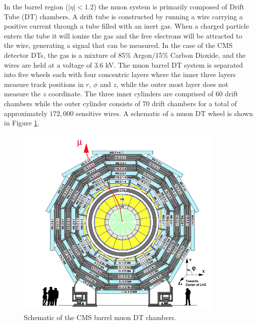 In the barrel region ($|\eta| < 1.2$) the muon system is primarily composed of Drift Tube (DT) chambers.
A drift tube is constructed by running a wire carrying a positive current through a tube filled with an inert gas.
When a charged particle enters the tube it will ionize the gas and the free electrons will be attracted to the wire, generating a signal that can be measured.
In the case of the CMS detector DTs, the gas is a mixture of 85\% Argon/15\% Carbon Dioxide, and the wires are held at a voltage of $3.6$ kV.
The muon barrel DT system is separated into five wheels each with four concentric layers where the inner three layers measure track positions in $r$, $\phi$ and $z$, while the outer most layer does not measure the $z$ coordinate.
The three inner cylinders are comprised of 60 drift chambers while the outer cylinder consists of 70 drift chambers for a total of approximately $172,000$ sensitive wires. 
A schematic of a muon DT wheel is shown in Figure \ref{fig:dtlayout}.
\begin{figure}[htpb]
\begin{center}
\includegraphics[width=0.9\textwidth]{plots/dtlayout.png}
\caption{Schematic of the CMS barrel muon DT chambers\cite{CMS_DETECTOR}.}
\label{fig:dtlayout}
\end{center}
\end{figure}

